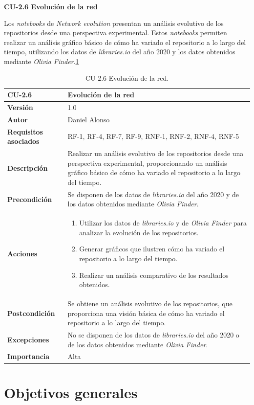 \textbf{CU-2.6 Evolución de la red}

Los \textit{notebooks} de \textit{Network evolution} presentan un análisis evolutivo de los repositorios
desde una perspectiva experimental. Estos \textit{notebooks} permiten realizar un análisis gráfico
básico de cómo ha variado el repositorio a lo largo del tiempo, utilizando los datos
de \textit{libraries.io} del año 2020 y los datos obtenidos mediante \textit{Olivia Finder}.\ref{tab:cu2.6}


\begin{table}[h!]
	\centering
	\begin{tabularx}{\linewidth}{ p{} p{} }
	\toprule
	\textbf{CU-2.6} & \textbf{Evolución de la red} \\
	\toprule
	\textbf{Versión} & 1.0 \\
	\textbf{Autor} & Daniel Alonso \\
	\textbf{Requisitos asociados} & RF-1, RF-4, RF-7, RF-9, RNF-1, RNF-2, RNF-4, RNF-5 \\
	\textbf{Descripción} & Realizar un análisis evolutivo de los repositorios desde una perspectiva experimental, proporcionando un análisis gráfico básico de cómo ha variado el repositorio a lo largo del tiempo. \\
	\textbf{Precondición} & Se disponen de los datos de \textit{libraries.io} del año 2020 y de los datos obtenidos mediante \textit{Olivia Finder}. \\
	\textbf{Acciones} & \begin{enumerate}
	\item Utilizar los datos de \textit{libraries.io} y de \textit{Olivia Finder} para analizar la evolución de los repositorios.
	\item Generar gráficos que ilustren cómo ha variado el repositorio a lo largo del tiempo.
	\item Realizar un análisis comparativo de los resultados obtenidos.
	\end{enumerate} \\
	\textbf{Postcondición} & Se obtiene un análisis evolutivo de los repositorios, que proporciona una visión básica de cómo ha variado el repositorio a lo largo del tiempo. \\
	\textbf{Excepciones} & No se disponen de los datos de \textit{libraries.io} del año 2020 o de los datos obtenidos mediante \textit{Olivia Finder}. \\
	\textbf{Importancia} & Alta \\
	\bottomrule
	\end{tabularx}
	\caption{CU-2.6 Evolución de la red.}
	\label{tab:cu2.6}
	\end{table}


\section{Objetivos generales}







